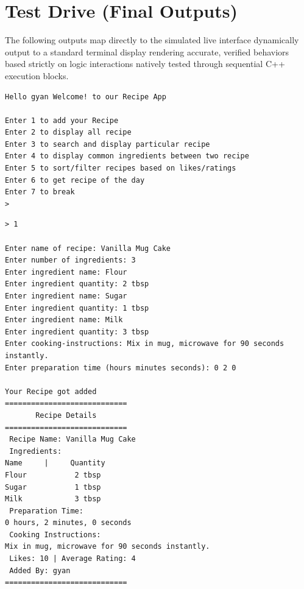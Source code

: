 \documentclass[12pt, a4paper]{article}
\begin{document}
\section{Test Drive (Final Outputs)}

The following outputs map directly to the simulated live interface dynamically output to a standard terminal display rendering accurate, verified behaviors based strictly on logic interactions natively tested through sequential C++ execution blocks.

\begin{terminalbox}
\begin{verbatim}
Hello gyan Welcome! to our Recipe App

Enter 1 to add your Recipe
Enter 2 to display all recipe
Enter 3 to search and display particular recipe
Enter 4 to display common ingredients between two recipe
Enter 5 to sort/filter recipes based on likes/ratings
Enter 6 to get recipe of the day
Enter 7 to break
> 
\end{verbatim}
\end{terminalbox}

\begin{terminalbox}
\begin{verbatim}
> 1

Enter name of recipe: Vanilla Mug Cake
Enter number of ingredients: 3
Enter ingredient name: Flour
Enter ingredient quantity: 2 tbsp
Enter ingredient name: Sugar
Enter ingredient quantity: 1 tbsp
Enter ingredient name: Milk
Enter ingredient quantity: 3 tbsp
Enter cooking-instructions: Mix in mug, microwave for 90 seconds instantly.
Enter preparation time (hours minutes seconds): 0 2 0

Your Recipe got added
============================
       Recipe Details       
============================
 Recipe Name: Vanilla Mug Cake
 Ingredients:
Name     |     Quantity
Flour           2 tbsp
Sugar           1 tbsp
Milk            3 tbsp
 Preparation Time: 
0 hours, 2 minutes, 0 seconds
 Cooking Instructions: 
Mix in mug, microwave for 90 seconds instantly.
 Likes: 10 | Average Rating: 4
 Added By: gyan
============================
\end{verbatim}
\end{terminalbox}
\end{document}
